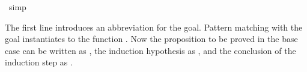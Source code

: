 \begin{isabellebody}
\ simp\isanewline
{}\isamarkupfalse%
%
\endisatagproof
{\isafoldproof}%
%
\isadelimproof
%
\endisadelimproof
%
\begin{isamarkuptext}%
The first line introduces an abbreviation  for the goal.
Pattern matching  with the goal instantiates  to the
function .  Now the proposition to
be proved in the base case can be written as , the induction
hypothesis as , and the conclusion of the induction step as
.


\end{isamarkuptext}
\end{isabellebody}
